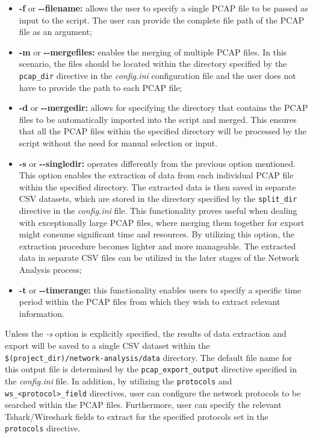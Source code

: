 \begin{itemize}
	\item \textbf{-f} or \textbf{{-}{-}filename:} allows the user to specify a single PCAP file to be passed as input to the script. The user can provide the complete file path of the PCAP file as an argument;
	
	\item \textbf{-m} or \textbf{{-}{-}mergefiles:} enables the merging of multiple PCAP files. In this scenario, the files should be located within the directory specified by the \texttt{pcap\_dir} directive in the \textit{config.ini} configuration file and the user does not have to provide the path to each PCAP file;
	
	\item \textbf{-d} or \textbf{{-}{-}mergedir:} allows for specifying the directory that contains the PCAP files to be automatically imported into the script and merged. This ensures that all the PCAP files within the specified directory will be processed by the script without the need for manual selection or input.
	
	\item \textbf{-s} or \textbf{{-}{-}singledir:} operates differently from the previous option mentioned. This option enables the extraction of data from each individual PCAP file within the specified directory. The extracted data is then saved in separate CSV datasets, which are stored in the directory specified by the \texttt{split\_dir} directive in the \textit{config.ini} file. This functionality proves useful when dealing with exceptionally large PCAP files, where merging them together for export might consume significant time and resources. By utilizing this option, the extraction procedure becomes lighter and more manageable. The extracted data in separate CSV files can be utilized in the later stages of the Network Analysis process;
	
	\item \textbf{-t} or \textbf{{-}{-}timerange:} this functionality enables users to specify a specific time period within the PCAP files from which they wish to extract relevant information.
\end{itemize}

Unless the \textit{-s} option is explicitly specified, the results of data extraction and export will be saved to a single CSV dataset within the \\ \texttt{\$(project\_dir)/network-analysis/data} directory. The default file name for this output file is determined by the \texttt{pcap\_export\_output} directive specified in the \textit{config.ini} file. 
In addition, by utilizing the \texttt{protocols} and \\ \texttt{ws\_<protocol>\_field} directives, user can configure the network protocols to be searched within the PCAP files. Furthermore, user can specify the relevant Tshark/Wireshark fields to extract for the specified protocols set in the \texttt{protocols} directive.


